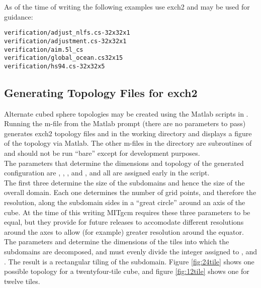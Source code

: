 As of the time of writing the following examples use exch2 and may be
used for guidance:

\begin{verbatim}
verification/adjust_nlfs.cs-32x32x1
verification/adjustment.cs-32x32x1 
verification/aim.5l_cs
verification/global_ocean.cs32x15
verification/hs94.cs-32x32x5
\end{verbatim}




\subsection{Generating Topology Files for exch2}
\label{sec:topogen}

Alternate cubed sphere topologies may be created using the Matlab
scripts in . Running the
m-file
from the Matlab prompt (there are no parameters to pass) generates
exch2 topology files  and
 in the working directory and displays a figure of
the topology via Matlab.  The other m-files in the directory are
subroutines of  and should not be run ``bare'' except
for development purposes. \\

The parameters that determine the dimensions and topology of the
generated configuration are , , ,
 and , and all are assigned early in the script. \\

The first three determine the size of the subdomains and
hence the size of the overall domain.  Each one determines the number
of grid points, and therefore the resolution, along the subdomain
sides in a ``great circle'' around an axis of the cube.  At the time
of this writing MITgcm requires these three parameters to be equal,
but they provide for future releases  to accomodate different
resolutions around the axes to allow (for example) greater resolution
around the equator.\\

The parameters  and  determine the dimensions of
the tiles into which the subdomains are decomposed, and must evenly
divide the integer assigned to ,  and .
The result is a rectangular tiling of the subdomain.  Figure
\ref{fig:24tile} shows one possible topology for a twentyfour-tile
cube, and figure \ref{fig:12tile} shows one for twelve tiles. \\

